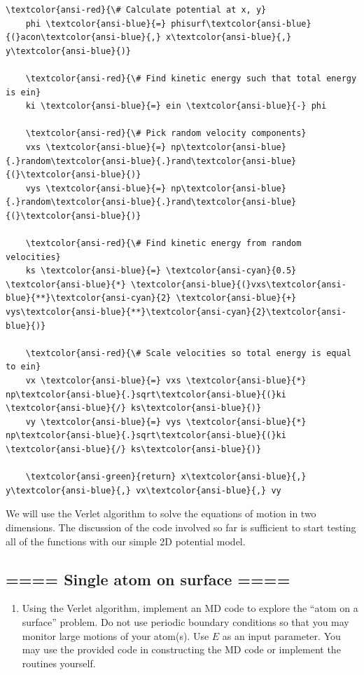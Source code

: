 \documentclass[11pt]{article}
\providecommand{\tightlist}{%
      \setlength{\itemsep}{0pt}\setlength{\parskip}{0pt}}
\begin{document}
\begin{Verbatim}[commandchars=\\\{\}]
    \textcolor{ansi-red}{\# Calculate potential at x, y}
    phi \textcolor{ansi-blue}{=} phisurf\textcolor{ansi-blue}{(}acon\textcolor{ansi-blue}{,} x\textcolor{ansi-blue}{,} y\textcolor{ansi-blue}{)}

    \textcolor{ansi-red}{\# Find kinetic energy such that total energy is ein}
    ki \textcolor{ansi-blue}{=} ein \textcolor{ansi-blue}{-} phi

    \textcolor{ansi-red}{\# Pick random velocity components}
    vxs \textcolor{ansi-blue}{=} np\textcolor{ansi-blue}{.}random\textcolor{ansi-blue}{.}rand\textcolor{ansi-blue}{(}\textcolor{ansi-blue}{)}
    vys \textcolor{ansi-blue}{=} np\textcolor{ansi-blue}{.}random\textcolor{ansi-blue}{.}rand\textcolor{ansi-blue}{(}\textcolor{ansi-blue}{)}

    \textcolor{ansi-red}{\# Find kinetic energy from random velocities}
    ks \textcolor{ansi-blue}{=} \textcolor{ansi-cyan}{0.5} \textcolor{ansi-blue}{*} \textcolor{ansi-blue}{(}vxs\textcolor{ansi-blue}{**}\textcolor{ansi-cyan}{2} \textcolor{ansi-blue}{+} vys\textcolor{ansi-blue}{**}\textcolor{ansi-cyan}{2}\textcolor{ansi-blue}{)}

    \textcolor{ansi-red}{\# Scale velocities so total energy is equal to ein}
    vx \textcolor{ansi-blue}{=} vxs \textcolor{ansi-blue}{*} np\textcolor{ansi-blue}{.}sqrt\textcolor{ansi-blue}{(}ki \textcolor{ansi-blue}{/} ks\textcolor{ansi-blue}{)}
    vy \textcolor{ansi-blue}{=} vys \textcolor{ansi-blue}{*} np\textcolor{ansi-blue}{.}sqrt\textcolor{ansi-blue}{(}ki \textcolor{ansi-blue}{/} ks\textcolor{ansi-blue}{)}

    \textcolor{ansi-green}{return} x\textcolor{ansi-blue}{,} y\textcolor{ansi-blue}{,} vx\textcolor{ansi-blue}{,} vy

    \end{Verbatim}

    
    We will use the Verlet algorithm to solve the equations of motion in two
dimensions. The discussion of the code involved so far is sufficient to
start testing all of the functions with our simple 2D potential model.

    \hypertarget{single-atom-on-surface}{%
\subsection{==== Single atom on surface
====}\label{single-atom-on-surface}}

    \begin{enumerate}
\def\labelenumi{\arabic{enumi}.}
\tightlist
\item
  Using the Verlet algorithm, implement an MD code to explore the ``atom
  on a surface'' problem. Do not use periodic boundary conditions so
  that you may monitor large motions of your atom(s). Use \(E\) as an
  input parameter. You may use the provided code in constructing the MD
  code or implement the routines yourself.
\end{enumerate}
\end{document}
